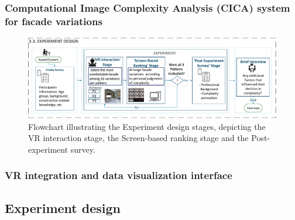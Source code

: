\documentclass[final,5p,times]{elsarticle}%
\begin{document}
\begin{linenumbers}
        \subsubsection{Computational Image Complexity Analysis (CICA) system for facade variations}
        \label{subsubsec:CICAforFacades}
        

            \begin{figure}[htb]
                \centering
                \includegraphics[width= \linewidth]{Images/FlowchartExperiment}
                  \caption{Flowchart illustrating the Experiment design stages, depicting the VR interaction stage, the Screen-based ranking stage and the Post-experiment survey.}
                  \label{fig:ExperimentFlowchart}
            \end{figure}

        \subsubsection{VR integration and data visualization interface}
        \label{subsubsec:VR_integration}
        


    \subsection{Experiment design}
    \label{subsec:Experiment_design}
    


\end{linenumbers}
\end{document}
